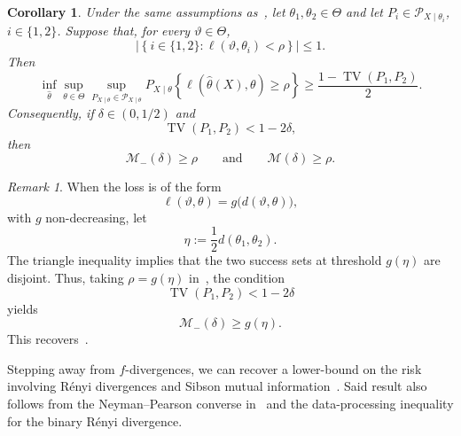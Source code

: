 \documentclass[11pt]{article}
\newtheorem{corollary}[theorem]{Corollary}
\theoremstyle{definition}
\theoremstyle{remark}
\newtheorem{remark}[theorem]{Remark}
\newcommand{\1}{\boldsymbol{1}}
\begin{document}
\begin{corollary}
\label{cor:leCam}
Under the same assumptions as~, let
$\theta_1,\theta_2\in\Theta$ and let
$P_i\in\mathscr P_{X\mid\theta_i}$, $i\in\{1,2\}$.
Suppose that, for every $\vartheta\in\Theta$,
\begin{equation}
    \left|
    \left\{
    i\in\{1,2\}:
    \ell(\vartheta,\theta_i)<\rho
    \right\}
    \right|
    \leq 1.
\end{equation}
Then
\begin{equation}
    \inf_{\widehat\theta}
    \sup_{\theta\in\Theta}
    \sup_{P_{X\mid\theta}\in\mathscr P_{X\mid\theta}}
    P_{X\mid\theta}
    \left\{
    \ell(\widehat\theta(X),\theta)\geq\rho
    \right\}
    \geq
    \frac{1-\operatorname{TV}(P_1,P_2)}{2}.
\end{equation}
Consequently, if $\delta\in(0,1/2)$ and
\begin{equation}
    \operatorname{TV}(P_1,P_2)<1-2\delta,
\end{equation}
then
\begin{equation}
    \mathcal M_{-}(\delta)\geq\rho
    \qquad\text{and}\qquad
    \mathcal M(\delta)\geq\rho.
\end{equation}
\end{corollary}


\begin{remark}
When the loss is of the form
\[
    \ell(\vartheta,\theta)=g\bigl(d(\vartheta,\theta)\bigr),
\]
with $g$ non-decreasing, let
\[
    \eta:=\frac12d(\theta_1,\theta_2).
\]
The triangle inequality implies that the two success sets at threshold
$g(\eta)$ are disjoint. Thus, taking
\(
    \rho=g(\eta)
\)
in~, the condition
\[
    \operatorname{TV}(P_1,P_2)<1-2\delta
\]
yields
\begin{equation}
    \mathcal M_{-}(\delta)\geq g(\eta).
\end{equation}
This recovers~\cite[Lemma 5]{MaVerchandSamworth2024}.
\end{remark}
Stepping away from $f$-divergences, we can recover a lower-bound on the risk involving R\'enyi divergences and Sibson mutual information~\cite{EspositoVandenbroucqueGastpar2024,EspositoGastparIssa2025}.
Said result also follows from the Neyman--Pearson converse in~ and the data-processing
inequality for the binary R\'enyi divergence.
\end{document}
